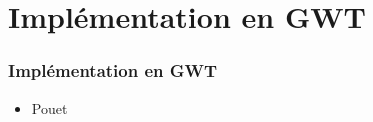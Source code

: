 \section{Implémentation en GWT}
  \begin{frame}
    \frametitle{Implémentation en GWT}
    \begin{itemize}
      \item Pouet
    \end{itemize}
  \end{frame}

